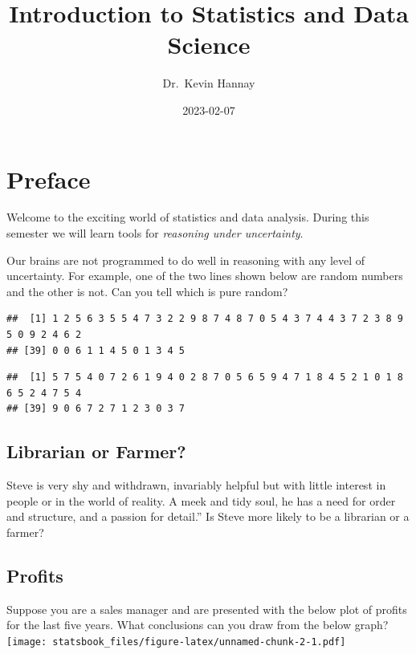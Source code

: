 \documentclass[
]{book}
\title{Introduction to Statistics and Data Science}
\author{Dr.~Kevin Hannay}
\date{2023-02-07}
\theoremstyle{definition}
\theoremstyle{definition}
\theoremstyle{definition}
\theoremstyle{definition}
\theoremstyle{remark}
\begin{document}
\maketitle

{
\setcounter{tocdepth}{1}
\tableofcontents
}
\hypertarget{preface}{%
\chapter{Preface}\label{preface}}

Welcome to the exciting world of statistics and data analysis. During this semester we will learn tools for \emph{reasoning under uncertainty}.

Our brains are not programmed to do well in reasoning with any level of uncertainty. For example, one of the two lines shown below are random numbers and the other is not. Can you tell which is pure random?

\begin{verbatim}
##  [1] 1 2 5 6 3 5 5 4 7 3 2 2 9 8 7 4 8 7 0 5 4 3 7 4 4 3 7 2 3 8 9 5 0 9 2 4 6 2
## [39] 0 0 6 1 1 4 5 0 1 3 4 5
\end{verbatim}

\begin{verbatim}
##  [1] 5 7 5 4 0 7 2 6 1 9 4 0 2 8 7 0 5 6 5 9 4 7 1 8 4 5 2 1 0 1 8 6 5 2 4 7 5 4
## [39] 9 0 6 7 2 7 1 2 3 0 3 7
\end{verbatim}

\hypertarget{librarian-or-farmer}{%
\section{Librarian or Farmer?}\label{librarian-or-farmer}}

Steve is very shy and withdrawn, invariably helpful but with little interest in people or in the world of reality. A meek and tidy soul, he has a need for order and structure, and a passion for detail.'' Is Steve more likely to be a librarian or a farmer?

\hypertarget{profits}{%
\section{Profits}\label{profits}}

Suppose you are a sales manager and are presented with the below plot of profits for the last five years. What conclusions can you draw from the below graph?
\texttt{[image: statsbook\_files/figure-latex/unnamed-chunk-2-1.pdf]}
\end{document}
